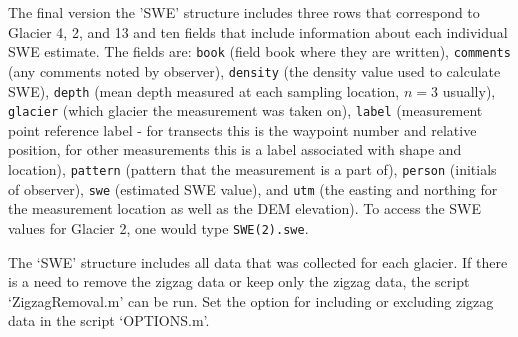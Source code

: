 \documentclass[12pt]{article}
\begin{document}
The final version the 'SWE' structure includes three rows that correspond to Glacier 4, 2, and 13 and ten fields that include information about each individual SWE estimate. The fields are: \texttt{book} (field book where they are written), \texttt{comments} (any comments noted by observer), \texttt{density} (the density value used to calculate SWE), \texttt{depth} (mean depth measured at each sampling location, $n=3$ usually), \texttt{glacier} (which glacier the measurement was taken on), \texttt{label} (measurement point reference label - for transects this is the waypoint number and relative position, for other measurements this is a label associated with shape and location), \texttt{pattern} (pattern that the measurement is a part of), \texttt{person} (initials of observer), \texttt{swe} (estimated SWE value), and \texttt{utm} (the easting and northing for the measurement location as well as the DEM elevation). To access the SWE values for Glacier 2, one would type \texttt{SWE(2).swe}. 

The `SWE' structure includes all data that was collected for each glacier. If there is a need to remove the zigzag data or keep only the zigzag data, the script `ZigzagRemoval.m' can be run. Set the option for including or excluding zigzag data in the script `OPTIONS.m'.






\end{document}
